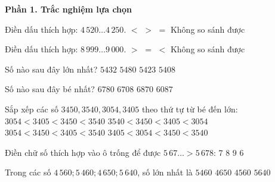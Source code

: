 \textbf{Phần 1. Trắc nghiệm lựa chọn}

\begin{ex} %
Điền dấu thích hợp: $4\,520 \dots 4\,250$.
\choice
{$<$}
{\True $>$}
{$=$}
{Không so sánh được}
\end{ex}

\begin{ex} %
Điền dấu thích hợp: $8\,999 \dots 9\,000$.
\choice
{$>$}
{$=$}
{\True $<$}
{Không so sánh được}
\end{ex}

\begin{ex} %
Số nào sau đây lớn nhất?
\choice
{$5432$}
{\True $5480$}
{$5423$}
{$5408$}
\end{ex}

\begin{ex} %
Số nào sau đây bé nhất?
\choice
{$6780$}
{$6708$}
{$6870$}
{\True $6087$}
\end{ex}

\begin{ex} %
Sắp xếp các số $3450, 3540, 3054, 3405$ theo thứ tự từ bé đến lớn:
\choice
{\True $3054 < 3405 < 3450 < 3540$}
{$3540 < 3450 < 3405 < 3054$}
{$3054 < 3450 < 3405 < 3540$}
{$3405 < 3054 < 3450 < 3540$}
\end{ex}

\begin{ex} %
Điền chữ số thích hợp vào ô trống để được $5\,67\dots > 5\,678$:
\choice
{$7$}
{$8$}
{\True $9$}
{$6$}
\end{ex}

\begin{ex} %
Trong các số $4\,560; 5\,460; 4\,650; 5\,640$, số lớn nhất là
\choice
{$5460$}
{$4650$}
{$4560$}
{\True $5640$}
\end{ex}

